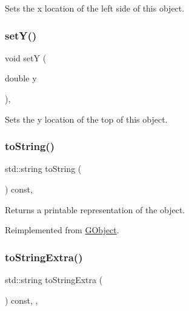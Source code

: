 Sets the x location of the left side of this object. 

\mbox{\label{classsgl_1_1GObject_a7d57e2a5c35d27feb58fd498a3cf82b9}} 
\subsubsection{\texorpdfstring{set\+Y()}{setY()}}
{\footnotesize\ttfamily void setY (\begin{DoxyParamCaption}\item[{double}]{y }\end{DoxyParamCaption})\hspace{0.3cm}{\ttfamily [virtual]}, {\ttfamily [inherited]}}



Sets the y location of the top of this object. 

\mbox{\label{classsgl_1_1GCompound_ab6e28321ea84864a7d677dd35c59523a}} 
\subsubsection{\texorpdfstring{to\+String()}{toString()}}
{\footnotesize\ttfamily std\+::string to\+String (\begin{DoxyParamCaption}{ }\end{DoxyParamCaption}) const\hspace{0.3cm}{\ttfamily [override]}, {\ttfamily [virtual]}}



Returns a printable representation of the object. 



Reimplemented from \mbox{\hyperlink{classsgl_1_1GObject_a1fe5121d6528fdea3f243321b3fa3a49}{G\+Object}}.

\mbox{\label{classsgl_1_1GObject_a4fcdf8de5c6de92242a975d83d8f23ea}} 
\subsubsection{\texorpdfstring{to\+String\+Extra()}{toStringExtra()}}
{\footnotesize\ttfamily std\+::string to\+String\+Extra (\begin{DoxyParamCaption}{ }\end{DoxyParamCaption}) const\hspace{0.3cm}{\ttfamily [protected]}, {\ttfamily [virtual]}, {\ttfamily [inherited]}}



